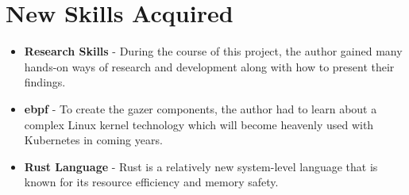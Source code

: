 \section{New Skills Acquired}

\begin{itemize}[noitemsep,nolistsep]
    \item \textbf{Research Skills} - During the course of this project, the author gained many hands-on ways of research and development along with how to present their findings.
    \item \textbf{\ac{ebpf}} - To create the \ac{gazer} components, the author had to learn about a complex Linux kernel technology which will become heavenly used with Kubernetes in coming years.
    \item \textbf{Rust Language} - Rust is a relatively new system-level language that is known for its resource efficiency and memory safety.
\end{itemize}